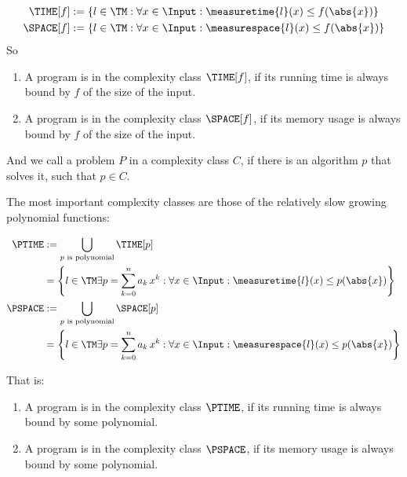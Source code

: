 \begin{defn}
	\begin{equation*}
		\begin{split}
			\TIME[f]  &:= \{l\in \TM : \forall x\in \Input:  \measuretime{l}(x) \leq f(\abs{x})\} \\
			\SPACE[f] &:= \{l\in \TM : \forall x\in \Input: \measurespace{l}(x) \leq f(\abs{x})\}
		\end{split}
	\end{equation*}
	So
	\begin{enumerate}
		\item A program is in the complexity class $\TIME[f]$, if its running time is always bound 
			by $f$ of the size of the input.
		\item A program is in the complexity class $\SPACE[f]$, if its memory usage is always bound 
			by $f$ of the size of the input.
	\end{enumerate}
	And we call a problem $P$ in a complexity class $C$, if there is an 
	algorithm $p$ that solves it, such that $p\in C$.
\end{defn}

The most important complexity classes are those of the relatively slow 
growing polynomial functions:

\begin{defn}
	\begin{equation*}
		\begin{split}
			\PTIME &:= \bigcup_{p\text{ is polynomial}}\TIME[p] \\
			&= \left\{l\in \TM \exists p=\sum^n_{k=0}a_k\,x^k: \forall x\in \Input: \measuretime{l}(x)\leq p(\abs{x})\right\}\\
			\PSPACE &:= \bigcup_{p\text{ is polynomial}}\SPACE[p] \\
			&= \left\{l\in \TM \exists p=\sum^n_{k=0}a_k\,x^k: \forall x\in \Input: \measurespace{l}(x)\leq p(\abs{x})\right\} 
		\end{split}
	\end{equation*}

	That is:
	\begin{enumerate}
		\item A program is in the complexity class $\PTIME$, if its running time is always bound 
			by some polynomial.
		\item A program is in the complexity class $\PSPACE$, if its memory usage is always bound 
			by some polynomial.
	\end{enumerate}
\end{defn}

